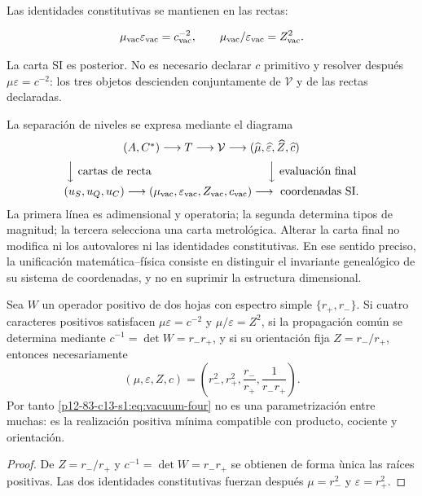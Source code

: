 Las identidades constitutivas se mantienen en las rectas:

\begin{equation}
\mu_{\rm vac}\varepsilon_{\rm vac}=c_{\rm vac}^{-2},
\qquad
\mu_{\rm vac}/\varepsilon_{\rm vac}=Z_{\rm vac}^2.
\end{equation}

La carta SI es posterior. No es necesario declarar \(c\) primitivo y resolver despu\'es \(\mu\varepsilon=c^{-2}\): los tres objetos descienden conjuntamente de \(\mathcal V\) y de las rectas declaradas.

La separaci\'on de niveles se expresa mediante el diagrama
\[
\begin{array}{c}
(A,C^*)\longrightarrow T\longrightarrow\mathcal V
\longrightarrow
(\widehat\mu,\widehat\varepsilon,\widehat Z,\widehat c)
\\[2mm]
\Big\downarrow\text{ cartas de recta}\hspace{36mm}
\Big\downarrow\text{ evaluaci\'on final}
\\[2mm]
(u_S,u_Q,u_C)\longrightarrow
(\mu_{\rm vac},\varepsilon_{\rm vac},Z_{\rm vac},c_{\rm vac})
\longrightarrow\text{ coordenadas SI}.
\end{array}
\]
La primera l\'inea es adimensional y operatoria; la segunda determina tipos de
magnitud; la tercera selecciona una carta metrol\'ogica. Alterar la carta final
no modifica ni los autovalores ni las identidades constitutivas. En ese
sentido preciso, la unificaci\'on matem\'atica--f\'isica consiste en distinguir
el invariante geneal\'ogico de su sistema de coordenadas, y no en suprimir la
estructura dimensional.

\begin{proposition}
Sea \(W\) un operador positivo de dos hojas con espectro simple
\(\{r_+,r_-\}\). Si cuatro caracteres positivos satisfacen
\(\mu\varepsilon=c^{-2}\) y \(\mu/\varepsilon=Z^2\), si la propagaci\'on
com\'un se determina mediante \(c^{-1}=\det W=r_-r_+\), y si su orientaci\'on
fija \(Z=r_-/r_+\), entonces necesariamente
\[
(\mu,\varepsilon,Z,c)
=\left(r_-^2,r_+^2,\frac{r_-}{r_+},\frac1{r_-r_+}\right).
\]
Por tanto \cref{p12-83-c13-s1:eq:vacuum-four} no es una parametrizaci\'on entre muchas:
es la realizaci\'on positiva m\'inima compatible con producto, cociente y
orientaci\'on.
\end{proposition}

\begin{proof}
De \(Z=r_-/r_+\) y \(c^{-1}=\det W=r_-r_+\) se obtienen de forma \`unica las
ra\'ices positivas. Las dos identidades constitutivas fuerzan despu\'es
\(\mu=r_-^2\) y \(\varepsilon=r_+^2\).
\end{proof}

